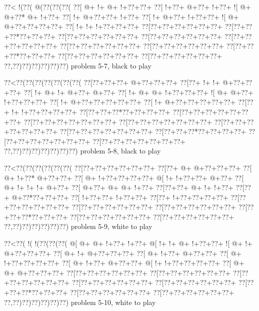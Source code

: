 \vbox{\vbox{\goo
\0??<\- !(\0??(\- @(\0??(\0??(\0??(
\0??[\- @+\- !+\- @+\- !+\0??+\0??+
\0??[\- !+\0??+\- @+\0??+\- !+\0??+
\- ![\- @+\- @+\0??*\- @+\- !+\0??+
\0??[\- !+\- @+\0??+\0??+\- !+\0??+
\0??[\- !+\- @+\0??+\- !+\0??+\0??+
\- ![\- @+\- @+\0??+\0??+\0??+\0??+
\0??[\- !+\- !+\- !+\0??+\0??+\0??+
\0??[\0??+\0??+\0??+\0??+\0??+\0??+
\0??[\0??+\0??+\0??*\0??+\0??+\0??+
\0??[\0??+\0??+\0??+\0??+\0??+\0??+
\0??[\0??+\0??+\0??+\0??+\0??+\0??+
\0??[\0??+\0??+\0??+\0??+\0??+\0??+
\0??[\0??+\0??+\0??+\0??+\0??+\0??+
\0??[\0??+\0??+\0??+\0??+\0??+\0??+
\0??[\0??+\0??+\0??*\0??+\0??+\0??+
\0??[\0??+\0??+\0??+\0??+\0??+\0??+
\0??[\0??+\0??+\0??+\0??+\0??+\0??+
\0??,\0??)\0??)\0??)\0??)\0??)\0??)
}
\hfil problem 5-7, black to play\hfil\break
}

\vbox{\vbox{\goo
\0??<\0??(\0??(\0??(\0??(\0??(\0??(\0??(
\0??[\0??+\0??+\0??+\- @+\0??+\0??+\0??+
\0??[\0??+\- !+\- !+\- @+\0??+\0??+\0??+
\0??[\- !+\- @+\- !+\- @+\0??+\- @+\0??+
\0??[\- !+\- @+\- @+\- !+\0??+\0??+\0??+
\- ![\- @+\- @+\0??+\- !+\0??+\0??+\0??+
\0??[\- !+\- @+\0??+\0??+\0??+\0??+\0??+
\0??[\- !+\- @+\0??+\0??+\0??+\0??+\0??+
\0??[\0??+\- !+\- !+\0??+\0??+\0??+\0??+
\0??[\0??+\0??+\0??*\0??+\0??+\0??+\0??+
\0??[\0??+\0??+\0??+\0??+\0??+\0??+\0??+
\0??[\0??+\0??+\0??+\0??+\0??+\0??+\0??+
\0??[\0??+\0??+\0??+\0??+\0??+\0??+\0??+
\0??[\0??+\0??+\0??+\0??+\0??+\0??+\0??+
\0??[\0??+\0??+\0??+\0??+\0??+\0??+\0??+
\0??[\0??+\0??+\0??*\0??+\0??+\0??+\0??+
\0??[\0??+\0??+\0??+\0??+\0??+\0??+\0??+
\0??[\0??+\0??+\0??+\0??+\0??+\0??+\0??+
\0??,\0??)\0??)\0??)\0??)\0??)\0??)\0??)
}
\hfil problem 5-8, black to play\hfil\break
}

\vbox{\vbox{\goo
\0??<\0??(\0??(\0??(\0??(\0??(\0??(
\0??[\0??+\0??+\0??+\0??+\0??+\0??+
\0??[\0??+\- @+\- @+\0??+\0??+\0??+
\0??[\- @+\- !+\0??*\- @+\0??+\0??+
\0??[\- @+\- !+\0??+\0??+\0??+\0??+
\- @[\- !+\- !+\0??+\0??+\- @+\0??+
\0??[\- @+\- !+\- !+\- !+\- @+\0??+
\0??[\- @+\0??+\- @+\- @+\- !+\0??+
\0??[\0??+\0??+\- @+\- !+\- !+\0??+
\0??[\0??+\- @+\0??*\0??+\0??+\0??+
\0??[\- !+\0??+\0??+\- !+\0??+\0??+
\0??[\0??+\- !+\0??+\0??+\0??+\0??+
\0??[\0??+\0??+\0??+\0??+\0??+\0??+
\0??[\0??+\0??+\0??+\0??+\0??+\0??+
\0??[\0??+\0??+\0??+\0??+\0??+\0??+
\0??[\0??+\0??+\0??*\0??+\0??+\0??+
\0??[\0??+\0??+\0??+\0??+\0??+\0??+
\0??[\0??+\0??+\0??+\0??+\0??+\0??+
\0??,\0??)\0??)\0??)\0??)\0??)\0??)
}
\hfil problem 5-9, white to play\hfil\break
}

\vbox{\vbox{\goo
\0??<\0??(\- !(\- !(\0??(\0??(\0??(
\- @[\- @+\- @+\- !+\0??+\- !+\0??+
\- @[\- !+\- !+\- @+\- !+\0??+\0??+
\- ![\- @+\- !+\- @+\0??+\0??+\0??+
\0??[\- @+\- !+\- @+\0??+\0??+\0??+
\0??[\- @+\- !+\0??+\- @+\0??+\0??+
\0??[\- @+\- !+\0??+\0??+\0??+\0??+
\0??[\- @+\- !+\0??+\- @+\0??+\0??+
\- @[\- !+\- !+\0??+\0??+\0??+\0??+
\0??[\- @+\- @+\- @+\0??+\0??+\0??+
\0??[\0??+\0??+\0??+\0??+\0??+\0??+
\0??[\0??+\0??+\0??+\0??+\0??+\0??+
\0??[\0??+\0??+\0??+\0??+\0??+\0??+
\0??[\0??+\0??+\0??+\0??+\0??+\0??+
\0??[\0??+\0??+\0??+\0??+\0??+\0??+
\0??[\0??+\0??+\0??*\0??+\0??+\0??+
\0??[\0??+\0??+\0??+\0??+\0??+\0??+
\0??[\0??+\0??+\0??+\0??+\0??+\0??+
\0??,\0??)\0??)\0??)\0??)\0??)\0??)
}
\hfil problem 5-10, white to play\hfil\break
}

